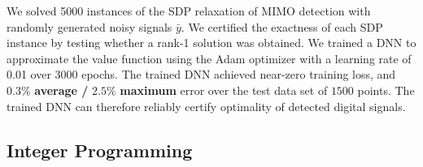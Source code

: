 \documentclass[10pt]{article} %
\theoremstyle{plain}
\theoremstyle{definition}
\theoremstyle{remark}
\begin{document}
We solved 5000 instances of the SDP relaxation of MIMO detection with randomly generated noisy signals $\bar{y}$. We certified the exactness of each SDP instance by testing whether a rank-1 solution was obtained. 
We trained a DNN to approximate the value function using the Adam optimizer with a learning rate of 0.01 over 3000 epochs. The trained DNN achieved near-zero training loss, and $\mathbf{0.3\%}$ \textbf{average / }$\mathbf{2.5\%}$ \textbf{maximum} error over the test data set of $1500$ points. The trained DNN can therefore reliably certify optimality of detected digital signals.

\subsection{Integer Programming}
\end{document}
